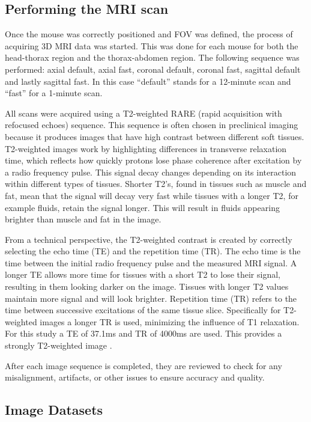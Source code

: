 \documentclass[twocolumn]{article}
\begin{document}
\subsection{Performing the MRI scan}

Once the mouse was correctly positioned and FOV was defined, the process of acquiring 3D MRI data was started. This was done for each mouse for both the head-thorax region and the thorax-abdomen region. The following sequence was performed: axial default, axial fast, coronal default, coronal fast, sagittal default and lastly sagittal fast. In this case ``default'' stands for a 12-minute scan and ``fast'' for a 1-minute scan.

All scans were acquired using a T2-weighted RARE (rapid acquisition with refocused echoes) sequence. This sequence is often chosen in preclinical imaging because it produces images that have high contrast between different soft tissues. T2-weighted images work by highlighting differences in transverse relaxation time, which reflects how quickly protons lose phase coherence after excitation by a radio frequency pulse. This signal decay changes depending on its interaction within different types of tissues. Shorter T2's, found in tissues such as muscle and fat, mean that the signal will decay very fast while tissues with a longer T2, for example fluids, retain the signal longer. This will result in fluids appearing brighter than muscle and fat in the image. 

From a technical perspective, the T2-weighted contrast is created by correctly selecting the echo time (TE) and the repetition time (TR). The echo time is the time between the initial radio frequency pulse and the measured MRI signal. A longer TE allows more time for tissues with a short T2 to lose their signal, resulting in them looking darker on the image. Tissues with longer T2 values maintain more signal and will look brighter. Repetition time (TR) refers to the time between successive excitations of the same tissue slice. Specifically for T2-weighted images a longer TR is used, minimizing the influence of T1 relaxation. For this study a TE of 37.1ms and TR of 4000ms are used. This provides a strongly T2-weighted image \cite{chavhan2009t2star}\cite{mrimaster2024}.  


After each image sequence is completed, they are reviewed to check for any misalignment, artifacts, or other issues to ensure accuracy and quality. 

\subsection{Image Datasets}
\end{document}
